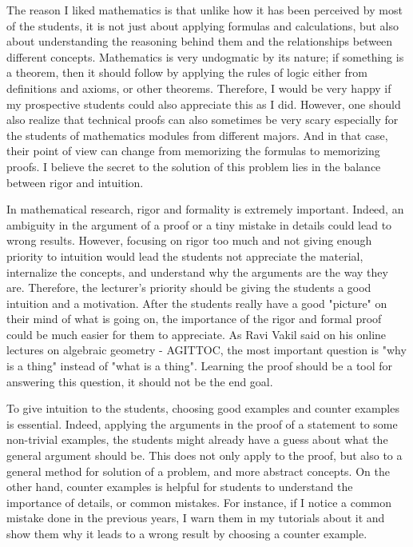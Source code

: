 \documentclass{article}
\begin{document}
\par The reason I liked mathematics is that unlike how it has been perceived by most of the students, it is not just about applying formulas and calculations, but also about understanding the reasoning behind them  and the relationships between different concepts. Mathematics is very undogmatic by its nature; if something is a theorem, then it should follow by applying the rules of logic either from definitions and axioms, or other theorems. Therefore, I would be very happy if my prospective students could also appreciate this as I did. However, one should also realize that technical proofs can also sometimes be very scary especially for the students of mathematics modules from different majors. And in that case, their point of view can change from memorizing the formulas to memorizing proofs. I believe the secret to the solution of this problem lies in the balance between rigor and intuition.

\vspace{5mm}

\par In mathematical research, rigor and formality is extremely important. Indeed, an ambiguity in the argument of a proof or a tiny mistake in details could lead to wrong results. However, focusing on rigor too much and not giving enough priority to intuition would lead the students not appreciate the material, internalize the concepts, and understand why the arguments are the way they are. Therefore, the lecturer's priority should be giving the students a good intuition and a motivation. After the students really have a good "picture" on their mind of what is going on, the importance of the rigor and formal proof could be much easier for them to appreciate. As Ravi Vakil said on his online lectures on algebraic geometry - AGITTOC, the most important question is "why is a thing" instead of "what is a thing". Learning the proof should be a tool for answering this question, it should not be the end goal.

\vspace{5mm}

\par To give intuition to the students, choosing good examples and counter examples is essential. Indeed, applying the arguments in the proof of a statement to some non-trivial examples, the students might already have a guess about what the general argument should be. This does not only apply to the proof, but also to a general method for solution of a problem, and more abstract concepts. On the other hand, counter examples is helpful for students to understand the importance of details, or common mistakes. For instance, if I notice a common mistake done in the previous years, I warn them in my tutorials about it and show them why it leads to a wrong result by choosing a counter example. 
\end{document}
